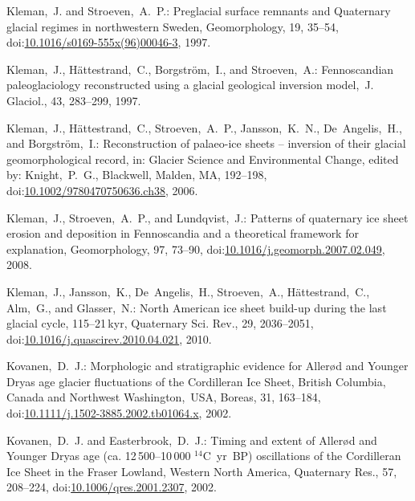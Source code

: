 \documentclass[tc, manuscript]{copernicus}
\begin{document}
\begin{thebibliography}{114}
Kleman,~J. and Stroeven,~A.~P.: Preglacial surface remnants and Quaternary glacial regimes in northwestern Sweden, Geomorphology, 19, 35--54,
doi:\href{http://dx.doi.org/10.1016/s0169-555x(96)00046-3}{10.1016/s0169-555x(96)00046-3}, 1997.


Kleman,~J., H{\"a}ttestrand,~C., Borgstr{\"o}m,~I., and Stroeven,~A.: Fennoscandian paleoglaciology reconstructed using a glacial geological inversion model,~J. Glaciol., 43, 283--299, 1997.


Kleman,~J., H{\"a}ttestrand,~C., Stroeven,~A.~P., Jansson,~K.~N., De~Angelis,~H., and Borgstr{\"o}m,~I.: Reconstruction of palaeo-ice sheets -- inversion of their glacial geomorphological record, in: Glacier Science and Environmental Change, edited by: Knight,~P.~G., Blackwell, Malden, MA, 192--198,
doi:\href{http://dx.doi.org/10.1002/9780470750636.ch38}{10.1002/9780470750636.ch38}, 2006.


Kleman,~J., Stroeven,~A.~P., and Lundqvist,~J.: Patterns of quaternary ice sheet erosion and deposition in Fennoscandia and a theoretical framework for explanation, Geomorphology, 97, 73--90,
doi:\href{http://dx.doi.org/10.1016/j.geomorph.2007.02.049}{10.1016/j.geomorph.2007.02.049}, 2008.


Kleman,~J., Jansson,~K., De~Angelis,~H., Stroeven,~A., H\"{a}ttestrand,~C., Alm,~G., and Glasser,~N.: North American ice sheet build-up during the last glacial cycle, 115--21\,kyr, Quaternary Sci. Rev., 29, 2036--2051,
doi:\href{http://dx.doi.org/10.1016/j.quascirev.2010.04.021}{10.1016/j.quascirev.2010.04.021}, 2010.


Kovanen,~D.~J.: Morphologic and stratigraphic evidence for Aller{\o}d and Younger Dryas age glacier fluctuations of the Cordilleran Ice Sheet, British Columbia, Canada and Northwest Washington,~USA, Boreas, 31, 163--184,
doi:\href{http://dx.doi.org/10.1111/j.1502-3885.2002.tb01064.x}{10.1111/j.1502-3885.2002.tb01064.x}, 2002.


Kovanen,~D.~J. and Easterbrook,~D.~J.: Timing and extent of Aller{\o}d and Younger Dryas age (ca. 12\,500--10\,000 $^{14}$C~yr~BP) oscillations of the Cordilleran Ice Sheet in the Fraser Lowland, Western North America, Quaternary Res., 57, 208--224,
doi:\href{http://dx.doi.org/10.1006/qres.2001.2307}{10.1006/qres.2001.2307}, 2002.



\end{thebibliography}
\end{document}
